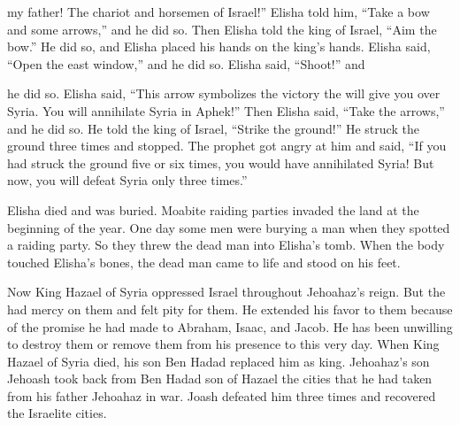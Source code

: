 {my father! The chariot
and horsemen
of Israel!”
Elisha
told
him, “Take
a bow
and some
arrows,”
and he did so.
Then Elisha told
the king
of Israel,
“Aim
the bow.”
He did so, and Elisha
placed
his hands
on
the king’s
hands.
Elisha said,
“Open
the east
window,”
and he did so.
Elisha
said,
“Shoot!” and
\par }{\PP he did so.
Elisha said,
“This arrow
symbolizes the victory
the
{}
will give you over Syria.
You will annihilate
Syria
in Aphek!”
Then Elisha said,
“Take
the arrows,”
and he did so.
He told
the king
of Israel,
“Strike
the ground!” He struck
the ground three
times
and stopped.
The prophet
got angry
at him and said,
“If you had struck
the ground five
or
six
times,
you would have annihilated
Syria!
 But now,
you will defeat
Syria
only three
times.”
\par }{\PP {}Elisha
died
and was buried.
Moabite
raiding parties
invaded
the land
at the beginning of the year.
One
day some men were
burying
a man
when
they spotted
a raiding party.
So they threw
the
dead man
into Elisha’s
tomb.
When the body touched
Elisha’s
bones,
the dead man
came
to life
and stood
on
his feet.
\par }{\PP {}Now King
Hazael
of Syria
oppressed
Israel
throughout
Jehoahaz’s reign.
But the
{}
had mercy
on
them and felt pity
for them. He extended
his favor to
them because
of the promise
he had made to Abraham,
Isaac,
and Jacob.
He has been unwilling
to destroy
them or
remove
them from
his presence
to this very day.
When King
Hazael
of Syria
died,
his son
Ben Hadad
replaced
him as king.
Jehoahaz’s
son
Jehoash
took
back
from Ben Hadad
son
of Hazael
the cities
that he had
taken
from his father
Jehoahaz
in war.
Joash
defeated
him three
times
and recovered
the Israelite
cities.

}

